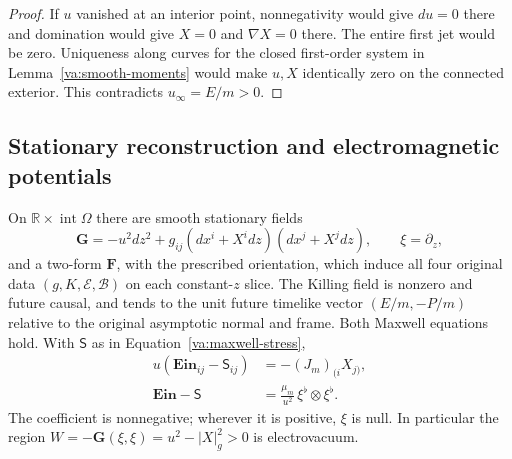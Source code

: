 \begin{proof}
If \(u\) vanished at an interior point, nonnegativity would give
\(du=0\) there and domination would give \(X=0\) and \(\nabla X=0\)
there.  The entire first jet would be zero.  Uniqueness along curves
for the closed first-order system in Lemma~\ref{va:smooth-moments}
would make \(u,X\) identically zero on the connected exterior.  This
contradicts \(u_\infty=E/m>0\).
\end{proof}

\subsection{Stationary reconstruction and electromagnetic potentials}

\begin{proposition}\label{va:stationary-data}
On \(\mathbb R\times\operatorname{int}\Omega\) there are smooth
stationary fields
\begin{equation}\label{va:stationary-metric}
 \mathbf G=-u^2dz^2+g_{ij}(dx^i+X^i dz)(dx^j+X^j dz),
 \qquad \xi=\partial_z,
\end{equation}
and a two-form \(\mathbf F\), with the prescribed orientation, which
induce all four original data \((g,K,\mathcal E,\mathcal B)\) on
each constant-\(z\) slice.  The Killing field is nonzero and future
causal, and tends to the unit future timelike vector
\((E/m,-P/m)\) relative to the original asymptotic normal and frame.
Both Maxwell equations hold.  With \(\mathsf S\) as in
Equation~\eqref{va:maxwell-stress},
\begin{align}
 u(\mathbf{Ein}_{ij}-\mathsf S_{ij})
       &=-(J_m)_{(i}X_{j)},\label{va:spatial-stress}\\
 \mathbf{Ein}-\mathsf S
       &=\frac{\mu_m}{u^2}\,\xi^\flat\otimes\xi^\flat.
       \label{va:null-stress}
\end{align}
The coefficient is nonnegative; wherever it is positive, \(\xi\) is
null.  In particular the region
\(W=-\mathbf G(\xi,\xi)=u^2-|X|_g^2>0\) is electrovacuum.
\end{proposition}

